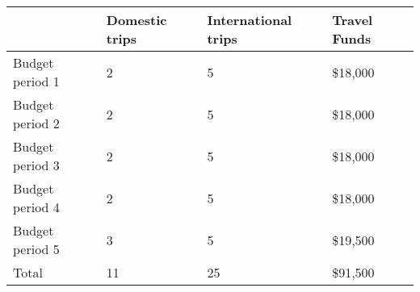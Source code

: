 \begin{tabular}{llll}
  \hline
  {} & Domestic trips & International trips & Travel Funds \\
  \hline
  Budget period 1 &              2 &                   5 &       \$18,000 \\
  Budget period 2 &              2 &                   5 &      \$18,000 \\
  Budget period 3 &              2 &                   5 &      \$18,000 \\
  Budget period 4 &              2 &                   5 &      \$18,000 \\
  Budget period 5 &              3 &                   5 &      \$19,500 \\
  \hline
  Total &              11 &                   25 &      \$91,500 \\
  \hline
\end{tabular}

